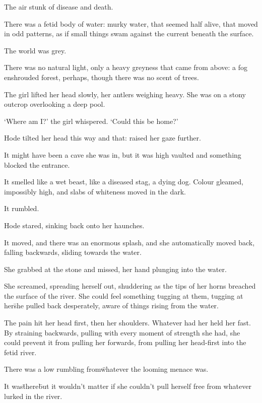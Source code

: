 

\prelude

The air stunk of disease and death.

There was a fetid body of water: murky water, that seemed half alive, that moved in odd patterns, as if 
small things swam against the current beneath the surface.

The world was grey.

There was no natural light, only a heavy greyness that came from above: a fog enshrouded forest, 
perhaps, though there was no scent of trees.

The girl lifted her head slowly, her antlers weighing heavy. She was on a stony outcrop overlooking a 
deep pool.

`Where am I?' the girl whispered. `Could this be home?'

\fugue

Hode tilted her head this way and that: raised her gaze further.

It might have been a cave she was in, but it was high vaulted and something blocked the entrance.

It smelled like a wet beast, like a diseased stag, a dying dog. Colour gleamed, impossibly high, and 
slabs of whiteness moved in the dark.

It rumbled.

Hode stared, sinking back onto her haunches.

It moved, and there was an enormous splash, and she automatically moved back, falling backwards, sliding 
towards the water.

She grabbed at the stone and missed, her hand plunging into the water.

She screamed, spreading herself out, shuddering as the tips of her horns breached the surface of the 
river. She could feel something tugging at them, tugging at her\=she pulled back desperately, aware of 
things rising from the water.

The pain hit her head first, then her shoulders. Whatever had her held her fast. By straining backwards, 
pulling with every moment of strength she had, she could prevent it from pulling her forwards, from 
pulling her head-first into the fetid river.

There was a low rumbling from\=whatever the looming menace was.

It was\=there\=but it wouldn't matter if she couldn't pull herself free from whatever lurked in the 
river.

